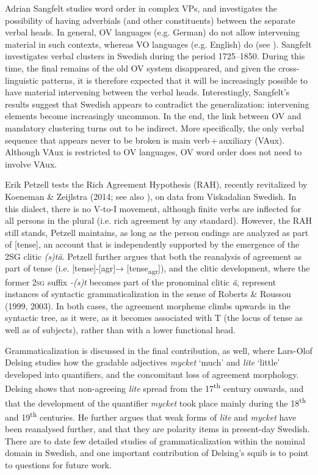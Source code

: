 \documentclass[output=paper]{langscibook}
\begin{document}
Adrian Sangfelt studies word order in complex VPs, and investigates the possibility of having adverbials (and other constituents) between the separate verbal heads. In general, OV languages (e.g. German) do not allow intervening material in such contexts, whereas VO languages (e.g. English) do (see \citealt{Haider2010,Haider2013, Haider2010}). Sangfelt investigates verbal clusters in Swedish during the period 1725–1850. During this time, the final remains of the old OV system disappeared, and given the cross-linguistic patterns, it is therefore expected that it will be increasingly possible to have material intervening between the verbal heads. Interestingly, Sangfelt’s results suggest that Swedish appears to contradict the generalization: intervening elements become increasingly uncommon. In the end, the link between OV and mandatory clustering turns out to be indirect. More specifically, the only verbal sequence that appears never to be broken is main verb\,+\,auxiliary (VAux). Although VAux is restricted to OV languages, OV word order does not need to involve VAux.



Erik Petzell tests the Rich Agreement Hypothesis (RAH), recently revitalized by Koeneman \& Zeijlstra (2014; see also \citealt{Tvica2017}), on data from Viskadalian Swedish. In this dialect, there is no V-to-I movement, although finite verbs are inflected for all persons in the plural (i.e. rich agreement by any standard). However, the RAH still stands, Petzell maintains, as long as the person endings are analyzed as part of [tense], an account that is independently supported by the emergence of the 2SG clitic \textit{(s)tä}. Petzell further argues that both the reanalysis of agreement as part of tense (i.e. [tense]-[agr]→ [tense\textsubscript{agr}]), and the clitic development, where the former \textsc{2sg} suffix \textit{{}-(s)t} becomes part of the pronominal clitic \textit{ä}, represent instances of syntactic grammaticalization in the sense of Roberts \& Roussou (1999, 2003). In both cases, the agreement morpheme climbs upwards in the syntactic tree, as it were, as it becomes associated with T (the locus of tense as well as of subjects), rather than with a lower functional head.



Grammaticalization is discussed in the final contribution, as well, where Lars-Olof Delsing studies how the gradable adjectives \textit{mycket} ‘much’ and \textit{lite} ‘little’ developed into quantifiers, and the concomitant loss of agreement morphology. Delsing shows that non-agreeing \textit{lite} spread from the 17\textsuperscript{th} century onwards, and that the development of the quantifier \textit{mycket} took place mainly during the 18\textsuperscript{th} and 19\textsuperscript{th} centuries. He further argues that weak forms of \textit{lite} and \textit{mycket} have been reanalysed further, and that they are polarity items in present-day Swedish. There are to date few detailed studies of grammaticalization within the nominal domain in Swedish, and one important contribution of Delsing’s squib is to point to questions for future work.
\end{document}
